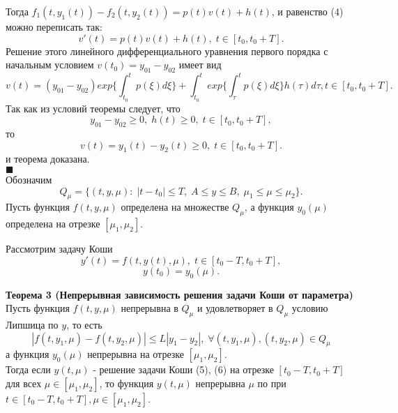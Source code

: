 Тогда $f_1(t,y_1(t))-f_2(t,y_2(t))=p(t)v(t)+h(t)$, и равенство (4) можно переписать так:
\begin{equation*}
v'(t)=p(t)v(t)+h(t),\; t\in[t_0,t_0+T].
\end{equation*}
Решение этого линейного дифференциального уравнения первого порядка с начальным условием $v(t_0)=y_{01}-y_{02}$ имеет вид
\begin{equation*}
v(t)=(y_{01}-y_{02})exp\big\{ \int_{t_0}^t p(\xi)d\xi \big\}+ \int_{t_0}^t exp\big\{\int_{\tau}^t p(\xi)d\xi \big\}h(\tau)d\tau , t\in[t_0,t_0+T].
\end{equation*}
Так как из условий теоремы следует, что 
\begin{equation*}
y_{01}-y_{02}\geq 0,\; h(t)\geq 0,\; t\in[t_0,t_0+T],
\end{equation*}
то
\begin{equation*}
v(t)=y_1(t)-y_2(t)\geq 0,\; t\in[t_0,t_0+T].
\end{equation*}
и теорема доказана.\\
$\blacksquare$\\

Обозначим
\begin{equation*}
Q_\mu=\{(t,y,\mu): \;|t-t_0|\leq T,\; A\leq y\leq B, \;\mu_1\leq \mu\leq \mu_2\}.
\end{equation*}
Пусть функция $f(t,y,\mu)$ определена на множестве $Q_\mu$, а функция $y_0(\mu)$ определена на отрезке $[\mu_1,\mu_2]$.

Рассмотрим задачу Коши
\begin{equation*}\tag{5}
y'(t)=f(t,y(t),\mu),\; t\in [t_0-T,t_0+T],
\end{equation*}
\begin{equation*}\tag{6}
y(t_0)=y_0(\mu).
\end{equation*}

\textbf{Теорема 3 (Непрерывная зависимость решения задачи Коши от параметра)}\\
Пусть функция $f(t,y,\mu)$ непрерывна в $Q_\mu$ и удовлетворяет в $Q_\mu$ условию Липшица по $y$, то есть
\begin{equation*}
|f(t,y_1,\mu)-f(t,y_2,\mu)|\leq L|y_1-y_2|, \;\forall(t,y_1,\mu),(t,y_2,\mu)\in Q_\mu
\end{equation*}
а функция $y_0(\mu)$ непрерывна на отрезке $[\mu_1,\mu_2]$.\\
Тогда если $y(t,\mu)$ - решение задачи Коши (5), (6) на отрезке $[t_0-T,t_0+T]$ для всех $\mu \in [\mu_1,\mu_2]$, то функция $y(t,\mu)$ непрерывна $\mu$ по при $t\in [t_0-T,t_0+T], \mu \in [\mu_1,\mu_2]$.\\

